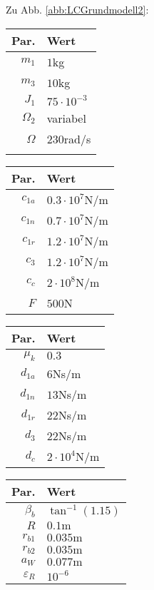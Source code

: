 Zu Abb. \ref{abb:LCGrundmodell2}:
\begin{center}
\begin{tabular}{r|l}
Par. &Wert\\\hline
$m_1$&$1$kg\\
$m_3$&$10$kg\\
$J_1$& $75\cdot10^{-3}$\\
$\Omega_2$&variabel\\
$\Omega$&$230$rad/s\\
&
\end{tabular} \hfill
\begin{tabular}{r|l}
Par. &Wert\\\hline
$c_{1a}$&$0.3\cdot10^{7}$N/m\\
$c_{1n}$&$0.7\cdot10^{7}$N/m \\
$c_{1r}$ & $1.2\cdot10^{7}$N/m\\
$c_{3}$ & $1.2\cdot10^{7}$N/m\\
$c_{c}$ & $2\cdot10^{8}$N/m\\
$F$&$500$N\\
\end{tabular} \hfill
\begin{tabular}{r|l}
Par. &Wert\\\hline
$\mu_k$& $0.3$\\
$d_{1a}$&$6$Ns/m\\
$d_{1n}$&$13$Ns/m \\
$d_{1r}$ &$22$Ns/m\\
$d_{3}$ & $22$Ns/m\\
$d_{c}$ & $2\cdot10^{4}$N/m
\end{tabular} \hfill
\begin{tabular}{r|l}
Par. &Wert\\\hline
$\beta_b$& $\tan^{-1}(1.15)$ \\
$R$&$0.1\textrm{m}$ \\
$r_{b1}$&$ 0.035\textrm{m}$\\
$r_{b2}$&$ 0.035\textrm{m}$\\
$a_{W}$&$ 0.077\textrm{m}$\\
$\varepsilon_R$&$10^{-6}$
\end{tabular}
\end{center}

